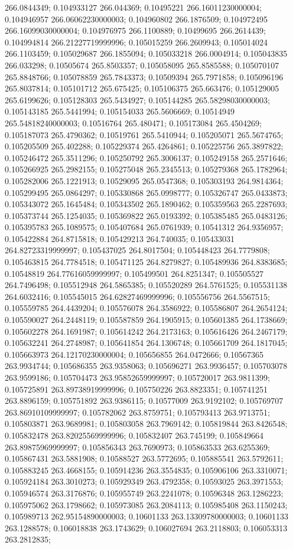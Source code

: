 266.0844349; 0.104933127 266.044369; 0.10495221 266.16011230000004; 0.104946957 266.06062230000003; 0.104960802 266.1876509; 0.104972495 266.16099030000004; 0.104976975 266.1100889; 0.10499695 266.2614439; 0.104994814 266.21227719999996; 0.105015259 266.2609943; 0.105014024 266.1103459; 0.105029687 266.1855094; 0.105033218 266.0004914; 0.105043835 266.033298; 0.10505674 265.8503357; 0.105058095 265.8585588; 0.105070107 265.8848766; 0.105078859 265.7843373; 0.10509394 265.7971858; 0.105096196 265.8037814; 0.105101712 265.675425; 0.105106375 265.663476; 0.105129005 265.6199626; 0.105128303 265.5434927; 0.105144285 265.58298030000003; 0.105143185 265.5441994; 0.105154033 265.5606669; 0.10514949 265.54818240000003; 0.10516764 265.480471; 0.105173084 265.4504269; 0.105187073 265.4790362; 0.10519761 265.5410944; 0.105205071 265.5674765; 0.105205509 265.402288; 0.105229374 265.4264861; 0.105225756 265.3897822; 0.105246472 265.3511296; 0.105250792 265.3006137; 0.105249158 265.2571646; 0.105266925 265.2982155; 0.105275048 265.2345513; 0.105279368 265.1782964; 0.105282006 265.1221913; 0.10529095 265.0547368; 0.105303193 264.9814364; 0.105299495 265.0864297; 0.105330868 265.0998777; 0.105326747 265.0433873; 0.105343072 265.1645484; 0.105343502 265.1890462; 0.105359563 265.2287693; 0.105373744 265.1254035; 0.105369822 265.0193392; 0.105385485 265.0483126; 0.105395783 265.1089575; 0.105407684 265.0761939; 0.10541312 264.9356957; 0.105422884 264.8715818; 0.105429213 264.740035; 0.105433031 264.82723319999997; 0.105437025 264.8017504; 0.105448423 264.7779808; 0.105463815 264.7784518; 0.105471125 264.8279827; 0.105489936 264.8383685; 0.10548819 264.77616059999997; 0.105499501 264.8251347; 0.105505527 264.7496498; 0.105512948 264.5865385; 0.105520289 264.5761525; 0.105531138 264.6032416; 0.105545015 264.62827469999996; 0.105556756 264.5567515; 0.105559785 264.4439204; 0.105576078 264.3586922; 0.105586807 264.2654124; 0.105590027 264.2448119; 0.105587859 264.1905915; 0.105601385 264.1738669; 0.105602278 264.1691987; 0.105614242 264.2173163; 0.105616426 264.2467179; 0.105632241 264.2748987; 0.105641854 264.1306748; 0.105661709 264.1817045; 0.105663973 264.12170230000004; 0.105656855 264.0472666; 0.10567365 263.9934744; 0.105686355 263.9358063; 0.105696271 263.9936457; 0.105703078 263.9599186; 0.105704473 263.95852659999997; 0.105720017 263.9811399; 0.105725891 263.89738919999996; 0.105750226 263.8823351; 0.105741251 263.8896159; 0.105751892 263.9386115; 0.10577009 263.9192102; 0.105769707 263.86910109999997; 0.105782062 263.8759751; 0.105793413 263.9713751; 0.105803871 263.9689981; 0.105803058 263.7969142; 0.105819844 263.8426548; 0.105832478 263.82025569999996; 0.105832407 263.745199; 0.105849664 263.89875969999997; 0.105856343 263.7690973; 0.105863533 263.6255369; 0.105867431 263.5881908; 0.10588527 263.5772695; 0.105885541 263.5792611; 0.105883245 263.4668155; 0.105914236 263.3554835; 0.105906106 263.3310071; 0.105924184 263.3010273; 0.105929349 263.4792358; 0.10593025 263.3971553; 0.105946574 263.3176876; 0.105955749 263.2241078; 0.10596348 263.1286223; 0.105975062 263.1798662; 0.105973085 263.2084113; 0.105985408 263.1150243; 0.105989713 262.95154890000003; 0.10601133 263.13309780000003; 0.10601133 263.1288578; 0.106018838 263.1743629; 0.106027694 263.2118803; 0.106053313 263.2812835; 